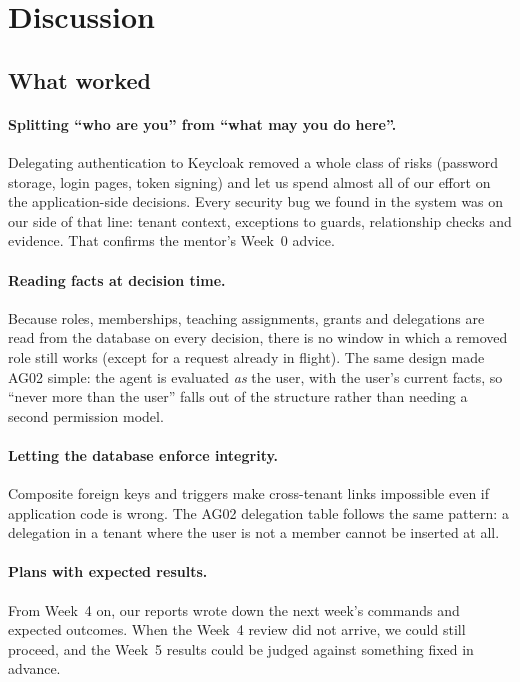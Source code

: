 \section{Discussion}
\label{sec:discussion}

\subsection{What worked}
\paragraph{Splitting ``who are you'' from ``what may you do here''.} Delegating authentication to Keycloak removed a whole class of risks (password storage, login pages, token signing) and let us spend almost all of our effort on the application-side decisions. Every security bug we found in the system was on our side of that line: tenant context, exceptions to guards, relationship checks and evidence. That confirms the mentor's Week~0 advice.

\paragraph{Reading facts at decision time.} Because roles, memberships, teaching assignments, grants and delegations are read from the database on every decision, there is no window in which a removed role still works (except for a request already in flight). The same design made AG02 simple: the agent is evaluated \emph{as} the user, with the user's current facts, so ``never more than the user'' falls out of the structure rather than needing a second permission model.

\paragraph{Letting the database enforce integrity.} Composite foreign keys and triggers make cross-tenant links impossible even if application code is wrong. The AG02 delegation table follows the same pattern: a delegation in a tenant where the user is not a member cannot be inserted at all.

\paragraph{Plans with expected results.} From Week~4 on, our reports wrote down the next week's commands and expected outcomes. When the Week~4 review did not arrive, we could still proceed, and the Week~5 results could be judged against something fixed in advance.

